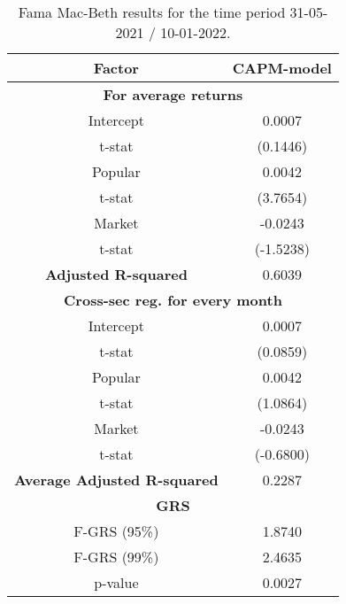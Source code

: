 \begin{table}[h!]
	\centering
	\captionsetup{skip=0.5\baselineskip}
	\caption{Fama Mac-Beth results for the time period 31-05-2021 / 10-01-2022.}
	\begin{tabular}{|c|c|}
		\hline
		\textbf{Factor} & \textbf{CAPM-model} \\ \hline
		\multicolumn{2}{|c|}{\textbf{For average returns}} \\ \hline
		Intercept & 0.0007 \\ 
		t-stat & (0.1446) \\ \hline
		Popular & 0.0042 \\ 
		t-stat & (3.7654)\\ \hline
		Market & -0.0243 \\
		t-stat & (-1.5238)\\ \hline
		\textbf{Adjusted R-squared} & 0.6039 \\ \hline
		\multicolumn{2}{|c|}{\textbf{Cross-sec reg. for every month}} \\ \hline
		Intercept & 0.0007 \\ 
		t-stat & (0.0859) \\ \hline
		Popular & 0.0042 \\ 
		t-stat & (1.0864)\\ \hline
		Market & -0.0243 \\
		t-stat & (-0.6800)\\ \hline
		\textbf{Average Adjusted R-squared} & 0.2287 \\ \hline
		\multicolumn{2}{|c|}{\textbf{GRS}} \\ \hline
		F-GRS (95\%) & 1.8740 \\ \hline
		F-GRS (99\%) & 2.4635 \\ \hline
		p-value & 0.0027 \\ \hline
	\end{tabular}
\end{table}


